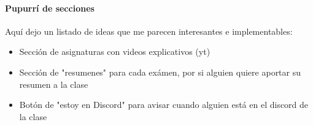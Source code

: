 \documentclass[a4paper]{article}
\begin{document}
\paragraph{Pupurrí de secciones }
Aquí dejo un listado de ideas que me parecen interesantes e implementables:\\
\begin{itemize}
    \item Sección de asignaturas con videos explicativos (yt)
    \item Sección de "resumenes" para cada exámen, por si alguien quiere aportar su resumen a la clase 
    \item Botón de "estoy en Discord" para avisar cuando alguien está en el discord de la clase
\end{itemize}
\end{document}
